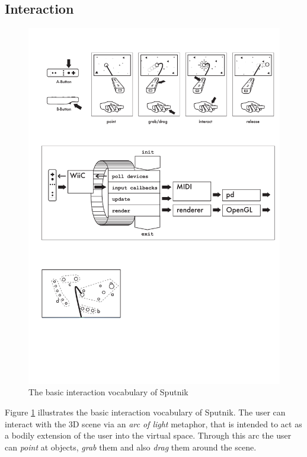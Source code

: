 \documentclass[10pt,a4paper]{scrartcl}
\begin{document}
\subsection{Interaction}
\label{sec:interaction}

\begin{figure}[hbtp]
\begin{center}
\includegraphics[width=0.95\columnwidth]{img/sputnik-overview}
\caption{The basic interaction vocabulary of Sputnik}
\label{fig:sputnik-overview}
\end{center}
\end{figure}

Figure \ref{fig:sputnik-overview} illustrates the basic interaction vocabulary of Sputnik. The user can interact with the 3D scene via an \emph{arc of light} metaphor, that is intended to act as a bodily extension of the user into the virtual space. Through this arc the user can \emph{point} at objects, \emph{grab} them and also \emph{drag} them around the scene.
\end{document}
